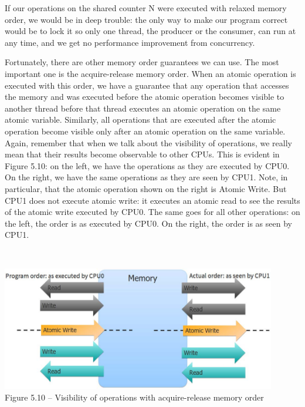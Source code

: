 If our operations on the shared counter N were executed with relaxed memory order, we would be in deep trouble: the only way to make our program correct would be to lock it so only one thread, the producer or the consumer, can run at any time, and we get no performance improvement from concurrency.

Fortunately, there are other memory order guarantees we can use. The most important one is the acquire-release memory order. When an atomic operation is executed with this order, we have a guarantee that any operation that accesses the memory and was executed before the atomic operation becomes visible to another thread before that thread executes an atomic operation on the same atomic variable. Similarly, all operations that are executed after the atomic operation become visible only after an atomic operation on the same variable. Again, remember that when we talk about the visibility of operations, we really mean that their results become observable to other CPUs. This is evident in Figure 5.10: on the left, we have the operations as they are executed by CPU0. On the right, we have the same operations as they are seen by CPU1. Note, in particular, that the atomic operation shown on the right is Atomic Write. But CPU1 does not execute atomic write: it executes an atomic read to see the results of the atomic write executed by CPU0. The same goes for all other operations: on the left, the order is as executed by CPU0. On the right, the order is as seen by CPU1.

\hspace*{\fill} \\ %
\begin{center}
\includegraphics[width=0.9\textwidth]{content/1/chapter5/images/10.jpg}\\
Figure 5.10 – Visibility of operations with acquire-release memory order
\end{center}

